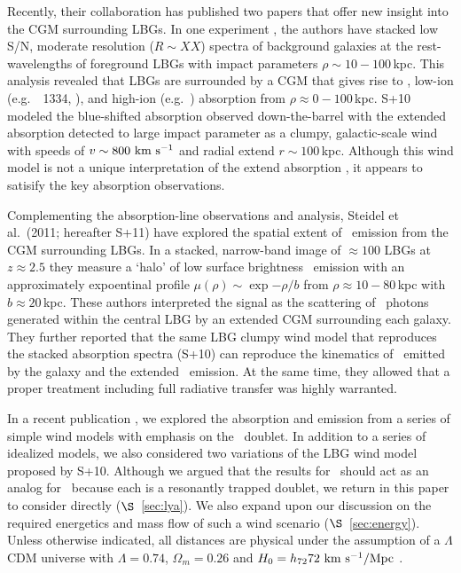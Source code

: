 \documentclass[12pt,preprint]{aastex}
\begin{document}
Recently, their
collaboration has published two papers that offer new insight into the
CGM surrounding LBGs.   In one experiment \citep[][hereafter
S+10]{steidel+10}, the authors have stacked low S/N, moderate
resolution ($R \sim XX$) spectra of background galaxies at the
rest-wavelengths of foreground LBGs with impact parameters $\rho \sim
10-100$\,kpc.  This analysis revealed that LBGs are surrounded by a
CGM that gives rise to , low-ion (e.g.\ ~1334,
), and high-ion (e.g.\ ) absorption from $\rho
\approx 0-100$\,kpc.  S+10 modeled the blue-shifted absorption
observed down-the-barrel with the extended absorption detected to
large impact parameter as a clumpy, galactic-scale wind with speeds of
$v \sim 800 \, \, {\rm km~s^{-1}}$ and radial extend $r \sim 100$\,kpc.  Although
this wind model is not a unique interpretation of the extend
 absorption \citep{fpk+11}, it appears to satisify the key
absorption observations.

Complementing the absorption-line observations and analysis,
Steidel et al.\ (2011; hereafter S+11) have explored the spatial
extent of \lya\ emission from the CGM surrounding LBGs.  In a stacked,
narrow-band image of $\approx 100$ LBGs at $z \approx 2.5$ they
measure a `halo' of low surface brightness \lya\ emission with an
approximately expoentinal profile $\mu(\rho) \sim \exp{-\rho/b}$ from
$\rho \approx 10-80$\,kpc with $b \approx 20$\,kpc.  These authors
interpreted the signal as the scattering of \lya\ photons generated
within the central LBG by an extended CGM surrounding each galaxy.
They further reported that the same LBG clumpy wind model that
reproduces the stacked absorption spectra (S+10) can reproduce the
kinematics of \lya\ emitted by the galaxy and the extended \lya\
emission.  At the same time, they allowed that a proper treatment
including full radiative transfer was highly warranted.  

In a recent publication \citep[][hereafter PKR11]{pkr11}, 
we explored the absorption and emission from
a series of simple wind models with emphasis on the
\mgiid\ doublet.  In addition to a
series of idealized models, we also considered two variations of the
LBG wind model proposed by S+10.  Although we argued that the results
for \mgii\ should act as an analog for \lya\ because each is a
resonantly trapped doublet, we return in this paper to consider
directly ($\S$~\ref{sec:lya}).  We also expand upon our discussion on the required
energetics and mass flow of such a wind scenario
($\S$~\ref{sec:energy}).  Unless otherwise indicated, all distances
are physical under the assumption of a $\Lambda$CDM universe with
$\Lambda = 0.74$, $\Omega_m = 0.26$ and 
$H_0 = h_{72} 72 \, \, {\rm km~s^{-1}}/{\rm Mpc}$ \citep{wmap05}.
\end{document}
